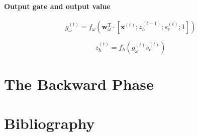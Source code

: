 \documentclass[12pt]{article}
\begin{document}
\paragraph{Output gate and output value}

$$g_{\omega}^{(t)} = f_{\omega}\left(\mathbf{w}_{\omega}^{\text{T}} \cdot \left[\mathbf{x}^{(t)}; z_{h}^{(t-1)}; s_c^{(t)}; 1\right]\right)$$

$$z_h^{(t)} = f_h\left(g_{\omega}^{(t)} s_c^{(t)}\right)$$

\section{The Backward Phase}

\appendix
\section{Bibliography}
\end{document}
